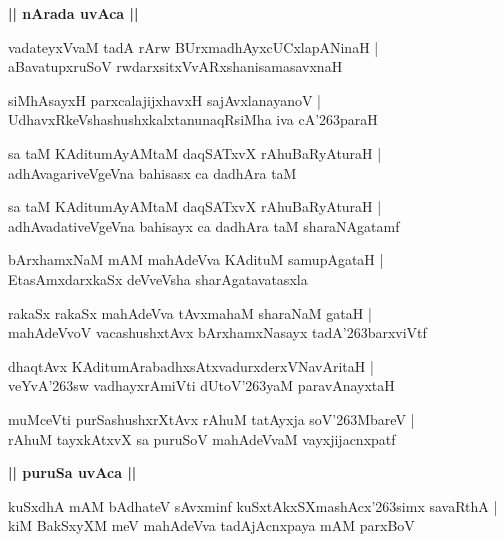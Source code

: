\documentclass[twoside,12pt,openright]{book}
\def\S{\char'263}
\newcounter{shloka}[chapter]
\def\uvaca#1{\centerline{{\large\textbf{#1}}}}
\begin{document}
\uvaca{|| nArada uvAca ||}

\begin{shloka}%
vadateyxVvaM tadA rArw BUrxmadhAyxcUCxlapANinaH |\\
aBavatupxruSoV rwdarxsitxVvARxshanisamasavxnaH 
\end{shloka}

\begin{shloka}%
siMhAsayxH parxcalajijxhavxH sajAvxlanayanoV |\\
UdhavxRkeVshashushxkalxtanunaqRsiMha iva cA\S paraH 
\end{shloka}

\begin{shloka}%
 sa taM KAditumAyAMtaM daqSATxvX rAhuBaRyAturaH |\\
 adhAvagariveVgeVna bahisasx ca dadhAra taM 
\end{shloka}

\begin{shloka}%
sa taM KAditumAyAMtaM daqSATxvX rAhuBaRyAturaH |\\
adhAvadativeVgeVna bahisayx ca dadhAra taM sharaNAgatamf
\end{shloka}

\begin{shloka}%
bArxhamxNaM mAM mahAdeVva KAdituM samupAgataH |\\
EtasAmxdarxkaSx deVveVsha sharAgatavatasxla 
\end{shloka}

\begin{shloka}%
rakaSx rakaSx mahAdeVva tAvxmahaM sharaNaM gataH |\\
mahAdeVvoV vacashushxtAvx bArxhamxNasayx tadA\S barxviVtf
\end{shloka}

\begin{shloka}%
dhaqtAvx KAditumArabadhxsAtxvadurxderxVNavAritaH |\\
veYvA\S sw vadhayxrAmiVti dUtoV\S yaM paravAnayxtaH 
\end{shloka}

\begin{shloka}%
muMceVti purSashushxrXtAvx rAhuM tatAyxja soV\S MbareV |\\
rAhuM tayxkAtxvX sa puruSoV mahAdeVvaM vayxjijacnxpatf 
\end{shloka}

\uvaca{|| puruSa uvAca ||}

\begin{shloka}%
kuSxdhA mAM bAdhateV sAvxminf kuSxtAkxSXmashAcx\S simx savaRthA |\\
kiM BakSxyXM meV mahAdeVva tadAjAcnxpaya mAM parxBoV
\end{shloka}
\end{document}

